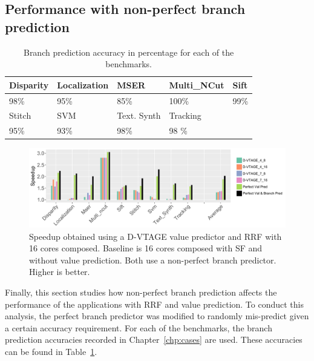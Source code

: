\subsection{Performance with non-perfect branch prediction}

\begin{table}[t]
  \small
  \centering
 \begin{tabular} { | l | l | l | l | l | }
 \hline
   \cellcolor[gray]{0.7}Disparity & \cellcolor[gray]{0.7} Localization& \cellcolor[gray]{0.7} MSER& \cellcolor[gray]{0.7} Multi\_NCut& \cellcolor[gray]{0.7} Sift\\ \hline
	98\%  & 95\% & 85\%  & 100\%& 99\%\\ \hline
	 \cellcolor[gray]{0.7} Stitch & \cellcolor[gray]{0.7} SVM & \cellcolor[gray]{0.7} Text. Synth & \cellcolor[gray]{0.7} Tracking&\\ \hline
	  95\%& 93\%& 98\%& 98 \%&\\ \hline
	\end{tabular}
  \caption{Branch prediction accuracy in percentage for each of the benchmarks.}\label{tab:sd-vbsbpred2}
\end{table}

\begin{figure}[t]
    \centering
    \includegraphics[width=1\textwidth]{chapter3/graphics/with_bpred.pdf}

    \caption{Speedup obtained using a D-VTAGE value predictor and RRF with 16 cores composed. Baseline is 16 cores composed with SF and without value prediction. Both use a non-perfect branch predictor. Higher is better.}
	\vspace{1em}
    \label{fig:bpred}
\end{figure}
Finally, this section studies how non-perfect branch prediction affects the performance of the applications with RRF and value prediction.
To conduct this analysis, the perfect branch predictor was modified to randomly mis-predict given a certain accuracy requirement.
For each of the benchmarks, the branch prediction accuracies recorded in Chapter~\ref{chp:cases} are used.
These accuracies can be found in Table~\ref{tab:sd-vbsbpred2}.

